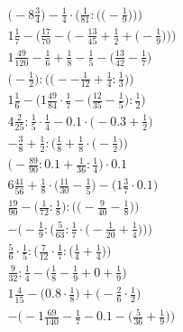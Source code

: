 \documentclass[8pt]{article}
\begin{document}
\begin{align}
\bigg(-8\frac{3}{4}\bigg) - \frac{1}{4} \cdot \bigg(\frac{1}{81} : \Big(\big(-\frac{1}{9}\big)\Big)\bigg) \\
1\frac{1}{7} - \bigg(\frac{17}{70} - \Big(-\frac{13}{45} + \frac{1}{2} + \big(-\frac{1}{9}\big)\Big)\bigg) \\
1\frac{49}{120} - \frac{1}{6} + \frac{1}{8} - \frac{1}{5} - \big(\frac{13}{42} - \frac{1}{7}\big) \\
\Big(-\frac{1}{2}\Big) : \Big(\big(--\frac{1}{12} + \frac{1}{4} : \frac{1}{3}\big)\Big) \\
1\frac{1}{6} - \Big(1\frac{49}{84} \cdot \frac{1}{7} - \big(\frac{12}{35} - \frac{1}{5}\big) : \frac{1}{2}\Big) \\
4\frac{2}{25} : \frac{1}{5} \cdot \frac{1}{4} - 0.1 \cdot \big(-0.3 + \frac{1}{2}\big) \\
-\frac{3}{8} + \frac{1}{2} : \Big(\frac{1}{8} + \frac{1}{8} \cdot \big(-\frac{1}{2}\big)\Big) \\
\big(-\frac{89}{90} : 0.1 + \frac{1}{36} : \frac{1}{4}\big) \cdot 0.1 \\
6\frac{41}{56} + \frac{1}{8} \cdot \big(\frac{11}{30} - \frac{1}{5}\big) - \big(1\frac{3}{7} \cdot 0.1\big) \\
\frac{19}{90} - \Big(\frac{1}{72} : \frac{1}{8}\Big) : \Big(\big(-\frac{9}{40} - \frac{1}{8}\big)\Big) \\
-\bigg(-\frac{1}{9} : \Big(\frac{5}{63} : \frac{1}{7} \cdot \big(-\frac{1}{20} + \frac{1}{4}\big)\Big)\bigg) \\
\frac{5}{6} \cdot \frac{1}{5} : \Big(\frac{7}{12} \cdot \frac{1}{7} : \big(\frac{1}{4} + \frac{1}{4}\big)\Big) \\
\frac{9}{32} : \frac{1}{4} - \big(\frac{1}{8} - \frac{1}{9} + 0 + \frac{1}{9}\big) \\
1\frac{4}{15} - \big(0.8 \cdot \frac{1}{8}\big) + \big(-\frac{2}{6} \cdot \frac{1}{2}\big) \\
-\Big(-1\frac{69}{140} - \frac{1}{7} - 0.1 - \big(\frac{5}{36} + \frac{1}{9}\big)\Big)
\end{align}
\end{document}
